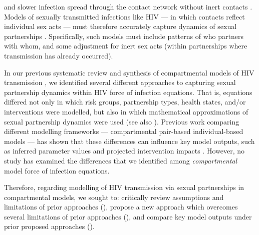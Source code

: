 and slower infection spread through the contact network \vs without inert contacts \cite{Smieszek2009}.
Models of sexually transmitted infections like HIV
--- in which contacts reflect individual sex acts ---
must therefore accurately capture dynamics of sexual partnerships \cite{Rao2021}.
Specifically, such models must include patterns of who partners with whom, and
some adjustment for inert sex acts (within partnerships where transmission has already occurred).
\par
In our previous systematic review and synthesis of
compartmental models of HIV transmission \cite{Knight2022sr},
we identified several different approaches to capturing sexual partnership dynamics
within HIV force of infection equations.
That is, equations differed not only in which
risk groups, partnership types, health states, and/or interventions were modelled,
but also in which mathematical approximations of sexual partnership dynamics were used
(see also \cite{Rao2021,Johnson2016mf}).
Previous work comparing different modelling frameworks
--- \ie compartmental \vs pair-based \vs individual-based models ---
has shown that these differences can influence key model outputs,
such as inferred parameter values and projected intervention impacts
\cite{Kretzschmar1998,Eames2002,Lloyd-Smith2004,Johnson2016mf}.
However, no study has examined the differences that we identified
among \emph{compartmental} model force of infection equations.
\par
Therefore, regarding modelling of HIV transmission
via sexual partnerships in compartmental models, we sought to:
critically review assumptions and limitations of prior approaches (),
propose a new approach which overcomes several limitations of prior approaches (),
and compare key model outputs under prior \vs proposed approaches ().

